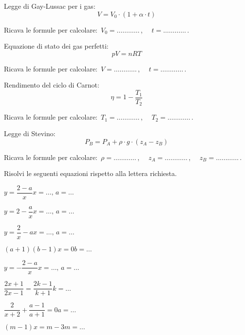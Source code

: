 \begin{esercizio}
\label{ese:20.64}
Legge di Gay-Lussac per i gas:
\begin{equation*}
  V=V_{0}\cdot (1+\alpha \cdot t)
\end{equation*}

Ricava le formule per calcolare:~\(V_0=\ldots\ldots\ldots\ldots\)\,, \(\quad 
t=\ldots\ldots\ldots\ldots\)\,.
\end{esercizio}

\begin{esercizio}
\label{ese:20.65}
Equazione di stato dei gas perfetti:
\begin{equation*}
  pV=nRT
\end{equation*}

Ricava le formule per calcolare:~\(V=\ldots\ldots\ldots\ldots\)\,, \(\quad 
t=\ldots\ldots\ldots\ldots\)\,.
\end{esercizio}

\begin{esercizio}
\label{ese:20.66}
Rendimento del ciclo di Carnot:
\begin{equation*}
  \eta =1-\dfrac{T_{1}}{T_{2}}
\end{equation*}

Ricava le formule per calcolare:~\(T_1=\ldots\ldots\ldots\ldots\)\,, \(\quad 
T_2=\ldots\ldots\ldots\ldots\)\,.
\end{esercizio}

\begin{esercizio}
\label{ese:20.67}
Legge di Stevino:
\begin{equation*}
  P_{B}=P_{A}+\rho \cdot g\cdot (z_{A}-z_{B})
\end{equation*}

Ricava le formule per calcolare:~\(\rho=\ldots\ldots\ldots\ldots\)\,, \(\quad 
z_A=\ldots\ldots\ldots\ldots\)\,, \(\quad z_B =\ldots\ldots\ldots\ldots\)\,.
\end{esercizio}


\begin{esercizio}
\label{ese:20.68}
Risolvi le seguenti equazioni rispetto alla lettera richiesta.
\begin{htmulticols}{2}
\TabPositions{2.5cm}
\begin{enumeratea}
 \item \(y=\dfrac{2-a}{x}\)\hfill\(x=\ldots,\,a=\ldots\)
 \item \(y=2-\dfrac{a}{x}\)\hfill\(x=\ldots,\,a=\ldots\)
 \item \(y=\dfrac{2}{x}-a\)\hfill\(x=\ldots,\,a=\ldots\)
 \item \((a+1)(b-1)x=0\)\hfill\(b=\ldots\)
 \item \(y=-{\dfrac{2-a}{x}}\)\hfill\(x=\ldots,\,a=\ldots\)
 \item \(\dfrac{2x+1}{2x-1}=\dfrac{2k-1}{k+1}\)\hfill\(k=\ldots\)
 \item \(\dfrac{2}{x+2}+\dfrac{a-1}{a+1}=0\)\hfill\(a=\ldots\)
 \item \((m-1)x=m-3\)\hfill\(m=\ldots\)
\end{enumeratea}
\end{htmulticols}
\end{esercizio}

